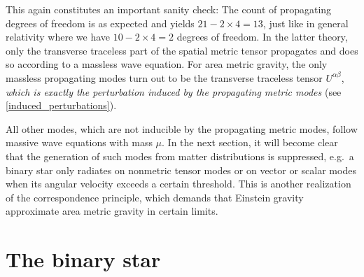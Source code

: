 This again constitutes an important sanity check: The count of propagating degrees of freedom is as expected and yields $21 - 2\times 4 = 13$, just like in general relativity where we have $10 - 2\times 4 = 2$ degrees of freedom. In the latter theory, only the transverse traceless part of the spatial metric tensor propagates and does so according to a massless wave equation. For area metric gravity, the only massless propagating modes turn out to be the transverse traceless tensor $U^{\alpha\beta}$, \emph{which is exactly the perturbation induced by the propagating metric modes} (see \eqref{induced_perturbations}).

All other modes, which are not inducible by the propagating metric modes, follow massive wave equations with mass $\mu$. In the next section, it will become clear that the generation of such modes from matter distributions is suppressed, e.g.~a binary star only radiates on nonmetric tensor modes or on vector or scalar modes when its angular velocity exceeds a certain threshold. This is another realization of the correspondence principle, which demands that Einstein gravity approximate area metric gravity in certain limits.

\section{The binary star}\label{section_binary_star}

